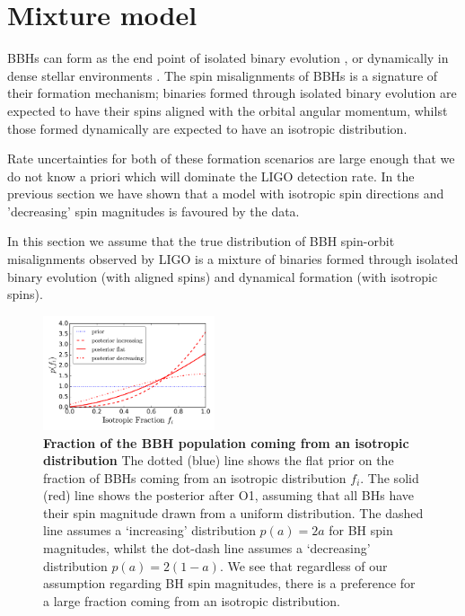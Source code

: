\documentclass[modern]{aastex61}
\begin{document}
\section{Mixture model}

BBHs can form as the end point of isolated binary evolution \cite{refs}, or dynamically in dense stellar environments \cite{refs}. The spin misalignments of BBHs is a signature of their formation mechanism; binaries formed through isolated binary evolution are expected to have their spins aligned with the orbital angular momentum, whilst those formed dynamically are expected to have an isotropic distribution.

Rate uncertainties for both of these formation scenarios are large enough that we do not know a priori which will dominate the LIGO detection rate. In the previous section we have shown that a model with isotropic spin directions and 'decreasing' spin magnitudes is favoured by the data.

In this section we assume that the true distribution of BBH spin-orbit misalignments observed by LIGO is a mixture of binaries formed through isolated binary evolution (with aligned spins) and dynamical formation (with isotropic spins). 

%
\begin{figure}
\centering
\includegraphics[width=0.45\textwidth]{../plots/posterior_on_isotropic_fraction.png}
\caption{\textbf{Fraction of the BBH population coming from an isotropic distribution} The dotted (blue) line shows the flat prior on the fraction of BBHs coming from an isotropic distribution $f_i$. The solid (red) line shows the posterior after O1, assuming that all BHs have their spin magnitude drawn from a uniform distribution. The dashed line assumes a `increasing' distribution $p(a) = 2a$ for BH spin magnitudes, whilst the dot-dash line assumes a `decreasing' distribution $p(a) = 2(1-a)$. We see that regardless of our assumption regarding BH spin magnitudes, there is a preference for a large fraction coming from an isotropic distribution.}
\label{fig:mixture_fraction_posterior}
\end{figure}
%
\end{document}
